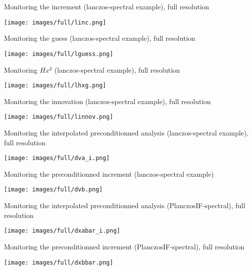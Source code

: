 \documentclass[francais]{beamer}
\begin{document}
\begin{frame}{Monitoring the increment (lanczos-spectral example), full resolution}
\begin{center}
 \texttt{[image: images/full/linc.png]}
\end{center}
\end{frame}
\begin{frame}{Monitoring the guess (lanczos-spectral example), full resolution}
\begin{center}
 \texttt{[image: images/full/lguess.png]}
\end{center}
\end{frame}
\begin{frame}{Monitoring $H x^g$ (lanczos-spectral example), full resolution }
\begin{center}
 \texttt{[image: images/full/lhxg.png]}
\end{center}
\end{frame}
\begin{frame}{Monitoring the innovation (lanczos-spectral example), full resolution}
\begin{center}
 \texttt{[image: images/full/linnov.png]}
\end{center}
\end{frame}

\begin{frame}{Monitoring the interpolated preconditionned analysis (lanczos-spectral example), full resolution}
\begin{center}
 \texttt{[image: images/full/dva\_i.png]}
\end{center}
\end{frame}
\begin{frame}{Monitoring the preconditionned increment (lanczos-spectral example)}
\begin{center}
 \texttt{[image: images/full/dvb.png]}
\end{center}
\end{frame}
\begin{frame}{Monitoring the interpolated preconditionned analysis (PlanczosIF-spectral), full resolution}
\begin{center}
 \texttt{[image: images/full/dxabar\_i.png]}
\end{center}
\end{frame}
\begin{frame}{Monitoring the preconditionned increment (PlanczosIF-spectral), full resolution}
\begin{center}
 \texttt{[image: images/full/dxbbar.png]}
\end{center}
\end{frame}
\end{document}
